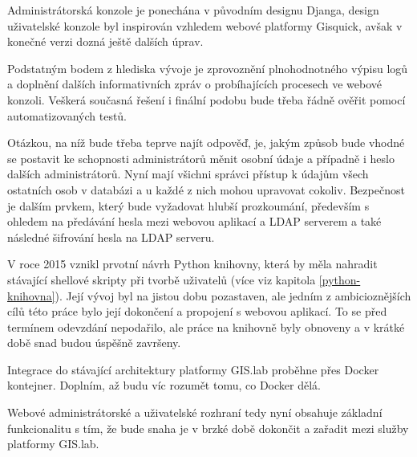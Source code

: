 Administrátorská konzole je ponechána v původním designu Djanga, design uživatelské konzole byl inspirován vzhledem webové platformy Gisquick, avšak v konečné verzi dozná ještě dalších úprav.

Podstatným bodem z hlediska vývoje je zprovoznění plnohodnotného výpisu logů a doplnění dalších informativních zpráv o probíhajících procesech ve webové konzoli. Veškerá současná řešení i finální podobu bude třeba řádně ověřit pomocí automatizovaných testů.

Otázkou, na níž bude třeba teprve najít odpověď, je, jakým způsob bude vhodné se postavit ke schopnosti administrátorů měnit osobní údaje a případně i heslo dalších administrátorů. Nyní mají všichni správci přístup k údajům všech ostatních osob v databázi a u každé z nich mohou upravovat cokoliv. Bezpečnost je dalším prvkem, který bude vyžadovat hlubší prozkoumání, především s ohledem na předávání hesla mezi webovou aplikací a LDAP serverem a také následné šifrování hesla na LDAP serveru. 

V roce 2015 vznikl prvotní návrh Python knihovny, která by měla nahradit stávající shellové skripty při tvorbě uživatelů (více viz kapitola \ref{python-knihovna}). Její vývoj byl na jistou dobu pozastaven, ale jedním z ambicioznějších cílů této práce bylo její dokončení a propojení s webovou aplikací. To se před termínem odevzdání nepodařilo, ale práce na knihovně byly obnoveny a v krátké době snad budou úspěšně završeny.

Integrace do stávající architektury platformy GIS.lab proběhne přes Docker kontejner. Doplním, až budu víc rozumět tomu, co Docker dělá.

Webové administrátorské a uživatelské rozhraní tedy nyní obsahuje základní funkcionalitu s tím, že bude snaha je v brzké době dokončit a zařadit mezi služby platformy GIS.lab.